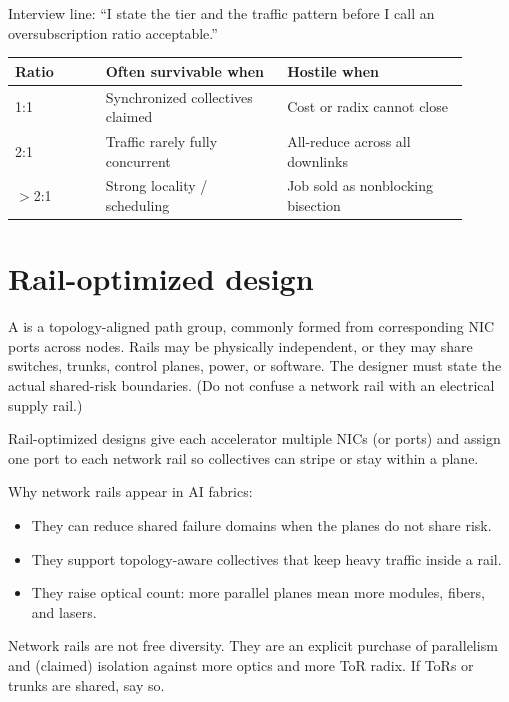 Interview line: ``I state the tier and the traffic pattern before I call an
oversubscription ratio acceptable.''

\begin{center}
\footnotesize
\begin{tabular}{@{}p{0.18\linewidth}p{0.36\linewidth}p{0.36\linewidth}@{}}
\toprule
Ratio & Often survivable when & Hostile when \\
\midrule
1:1 & Synchronized collectives claimed & Cost or radix cannot close \\
2:1 & Traffic rarely fully concurrent & All-reduce across all downlinks \\
$>$2:1 & Strong locality / scheduling & Job sold as nonblocking bisection \\
\bottomrule
\end{tabular}
\end{center}

\section{Rail-optimized design}
\label{sec:hpc-rails}

A  is a topology-aligned path group,
commonly formed from corresponding NIC ports across nodes. Rails may be
physically independent, or they may share switches, trunks, control planes,
power, or software. The designer must state the actual shared-risk boundaries.
(Do not confuse a network rail with an electrical supply rail.)

Rail-optimized designs give each accelerator multiple NICs (or ports) and
assign one port to each network rail so collectives can stripe or stay within a
plane.

Why network rails appear in AI fabrics:

\begin{itemize}
\item They can reduce shared failure domains when the planes do not share risk.
\item They support topology-aware collectives that keep heavy traffic inside a
      rail.
\item They raise optical count: more parallel planes mean more modules, fibers,
      and lasers.
\end{itemize}

Network rails are not free diversity. They are an explicit purchase of
parallelism and (claimed) isolation against more optics and more ToR radix.
If ToRs or trunks are shared, say so.

